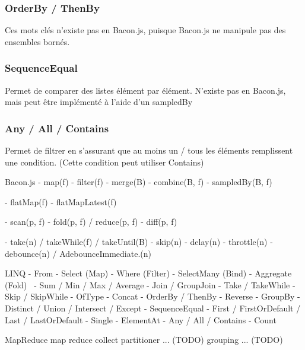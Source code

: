     \subsubsection{OrderBy / ThenBy}
      Ces mots clés n'existe pas en Bacon.js, puisque Bacon.js ne manipule pas des ensembles bornés.

    \subsubsection{SequenceEqual}
      Permet de comparer des listes élément par élément.
      N'existe pas en Bacon.js, mais peut être implémenté à l'aide d'un sampledBy

    \subsubsection{Any / All / Contains}
      Permet de filtrer en s'assurant que au moins un / tous les éléments remplissent une condition.
      (Cette condition peut utiliser Contains)

  Bacon.js
  -  map(f)
  -  filter(f)
  -  merge(B)
  -  combine(B, f)
  -  sampledBy(B, f)

  -  flatMap(f)
  -  flatMapLatest(f)

  -  scan(p, f)
  -  fold(p, f) / reduce(p, f)
  -  diff(p, f)

  -  take(n) / takeWhile(f) / takeUntil(B)
  -  skip(n)
  -  delay(n)
  -  throttle(n)
  -  debounce(n) / AdebounceImmediate.(n)

  LINQ
  -  From
  -  Select (Map)
  -  Where (Filter)
  -  SelectMany (Bind)
  -  Aggregate (Fold) 
  -  Sum / Min / Max / Average
  -  Join / GroupJoin
  -  Take / TakeWhile
  -  Skip / SkipWhile
  -  OfType
  -  Concat
  -  OrderBy / ThenBy
  -  Reverse
  -  GroupBy
  -  Distinct / Union / Intersect / Except
  -  SequenceEqual
  -  First / FirstOrDefault / Last / LastOrDefault
  -  Single
  -  ElementAt
  -  Any / All / Contains
  -  Count

  MapReduce
    map
    reduce
    collect
    partitioner ... (TODO)
    grouping ... (TODO)